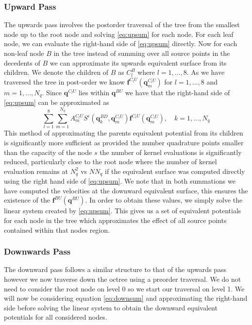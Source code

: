 \subsubsection{Upward Pass}
The upwards pass involves the postorder traversal of the tree from the smallest node up to the root node and solving \cref{eq:upsum} for each node. For each leaf node, we can evaluate the right-hand side of \cref{eq:upsum} directly. Now for each non-leaf node $B$ in the tree instead of summing over all source points in the decedents of $B$ we can approximate its upwards equivalent surface from its children. We denote the children of $B$ as $C_l^B$ where $l=1,...,8$. As we have traversed the tree in post-order we know $\mathbf{f}^{C_l U}(\mathbf{q}^{C_lU}_m)$ for $l=1,\dots,8$ and $m=1,\dots,N_q$. Since $\mathbf{q}^{C_lU}$ lies within $\mathbf{q}^{BU}$ we have that the right-hand side of \cref{eq:upsum} can be approximated as 
\begin{equation}
\label{eq:M2M}
    \sum_{l=1}^{8} \sum_{m=1}^{N_{q}} A_{m}^{C_{l} U} S^\epsilon\left(\mathbf{q}_{k}^{B D}, \mathbf{q}_{m}^{C_{l} U}\right) \mathbf{f}^{C_{l} U}\left(\mathbf{q}_{m}^{C_{l} U}\right), \quad k=1,\dots,N_q
\end{equation}
This method of approximating the parents equivalent potential from its children is significantly more sufficient as provided the number quadrature points smaller than the capacity of the node $s$ the number of kernel evaluations is significantly reduced, particularly close to the root node where the number of kernel evaluation remains at $N_q^2$ vs $N N_q$ if the equivalent surface was computed directly using the right hand side of \cref{eq:upsum}. We note that in both summations we have computed the velocities at the downward equivalent surface, this ensures the existence of the $\mathbf{f}^{BU}(\mathbf{q}^{BU})$. In order to obtain these values, we simply solve the linear system created by \cref{eq:upsum}. This gives us a set of equivalent potentials for each node in the tree which approximates the effect of all source points contained within that nodes region. 

\subsubsection{Downwards Pass}
The downward pass follows a similar structure to that of the upwards pass however we now traverse down the octree using a preorder traversal. We do not need to consider the root node on level 0 so we start our traversal on level 1. We will now be considering equation \cref{eq:downsum} and approximating the right-hand side before solving the linear system to obtain the downward equivalent potentials for all considered nodes. 

